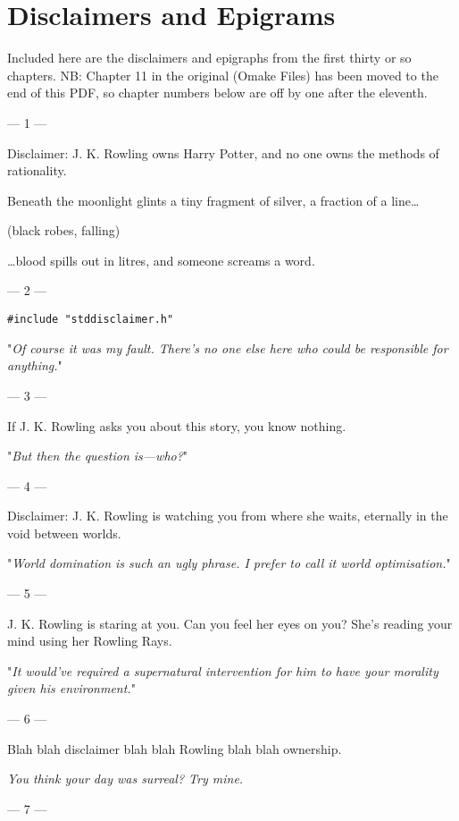 \chapter{Disclaimers and Epigrams}

Included here are the disclaimers and epigraphs from the first thirty or so
chapters. NB: Chapter 11 in the original (Omake Files) has been moved to
the end of this PDF, so chapter numbers below are off by one after the eleventh.
\sbreak
{
\setlength{\parindent}{0pt}
\setlength{\parskip}{1em}

--- 1 ---

Disclaimer: J. K. Rowling owns Harry Potter, and no one owns the methods of rationality.

\begin{em}
Beneath the moonlight glints a tiny fragment of silver, a fraction of a line{\ldots}

(black robes, falling)

{\ldots}blood spills out in litres, and someone screams a word.
\end{em}

--- 2 ---

\texttt{\#include "stddisclaimer.h"}

"\emph{Of course it was my fault. There's no one else here who could be 
responsible for anything.}"

--- 3 ---

If J. K. Rowling asks you about this story, you know nothing.

"\emph{But then the question is---who?}"

--- 4 ---

Disclaimer: J. K.
Rowling is watching you from where she waits, eternally in the void between
worlds.

"\emph{World domination is such an ugly phrase. I prefer to call it world
optimisation.}"

--- 5 ---

J. K. Rowling is
staring at you. Can you feel her eyes on you? She's reading your mind using her
Rowling Rays.

"\emph{It would've required a \emph{supernatural intervention} for him to have
\emph{your} morality given \emph{his} environment.}"

--- 6 ---

Blah blah
disclaimer blah blah Rowling blah blah ownership.

\emph{You think your day was surreal? Try mine.}

--- 7 ---

}
